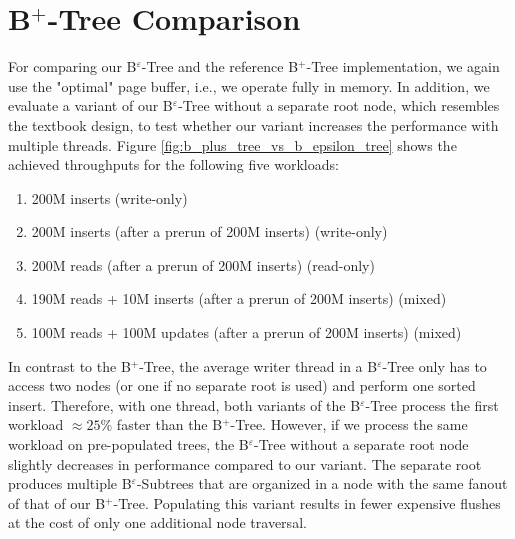\section{B$^+$-Tree Comparison}\label{6.3}

For comparing our B$^\varepsilon$-Tree and the reference B$^+$-Tree implementation, we again use the "optimal" page buffer, i.e., we operate fully in memory. In addition, we evaluate a variant of our B$^\varepsilon$-Tree without a separate root node, which resembles the textbook design, to test whether our variant increases the performance with multiple threads. Figure \ref{fig:b_plus_tree_vs_b_epsilon_tree} shows the achieved throughputs for the following five workloads:

\begin{enumerate}
\item 200M inserts (write-only)
\item 200M inserts (after a prerun of 200M inserts) (write-only)
\item 200M reads (after a prerun of 200M inserts)  (read-only)
\item 190M reads + 10M inserts (after a prerun of 200M inserts) (mixed)
\item 100M reads + 100M updates (after a prerun of 200M inserts) (mixed)
\end{enumerate}

In contrast to the B$^+$-Tree, the average writer thread in a B$^\varepsilon$-Tree only has to access two nodes (or one if no separate root is used) and perform one sorted insert. Therefore, with one thread, both variants of the B$^\varepsilon$-Tree process the first workload $\approx 25\%$ faster than the B$^+$-Tree. However, if we process the same workload on pre-populated trees, the B$^\varepsilon$-Tree without a separate root node slightly decreases in performance compared to our variant. The separate root produces multiple B$^\varepsilon$-Subtrees that are organized in a node with the same fanout of that of our B$^+$-Tree. Populating this variant results in fewer expensive flushes at the cost of only one additional node traversal.

